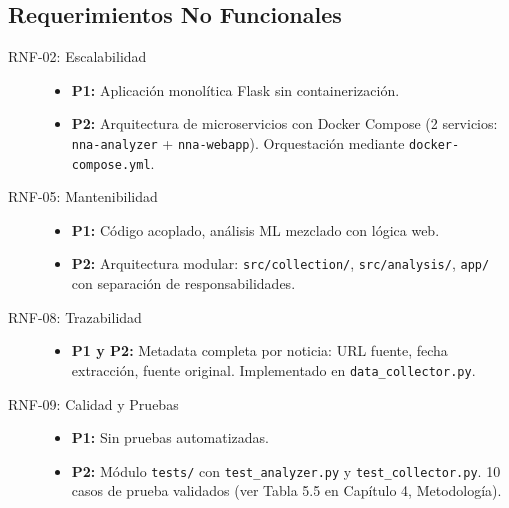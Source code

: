 \subsection{Requerimientos No Funcionales}
\label{subsec:rnf}

\begin{description}
    \item[RNF-02: Escalabilidad] 
    \begin{itemize}
        \item \textbf{P1:} Aplicación monolítica Flask sin containerización.
        \item \textbf{P2:} Arquitectura de microservicios con Docker Compose (2 servicios: \texttt{nna-analyzer} + \texttt{nna-webapp}). Orquestación mediante \texttt{docker-compose.yml}.
    \end{itemize}
    
    \item[RNF-05: Mantenibilidad] 
    \begin{itemize}
        \item \textbf{P1:} Código acoplado, análisis ML mezclado con lógica web.
        \item \textbf{P2:} Arquitectura modular: \texttt{src/collection/}, \texttt{src/analysis/}, \texttt{app/} con separación de responsabilidades.
    \end{itemize}
    
    \item[RNF-08: Trazabilidad] 
    \begin{itemize}
        \item \textbf{P1 y P2:} Metadata completa por noticia: URL fuente, fecha extracción, fuente original. Implementado en \texttt{data\_collector.py}.
    \end{itemize}
    
    \item[RNF-09: Calidad y Pruebas] 
    \begin{itemize}
        \item \textbf{P1:} Sin pruebas automatizadas.
        \item \textbf{P2:} Módulo \texttt{tests/} con \texttt{test\_analyzer.py} y \texttt{test\_collector.py}. 10 casos de prueba validados (ver Tabla 5.5 en Capítulo 4, Metodología).
    \end{itemize}
\end{description}


